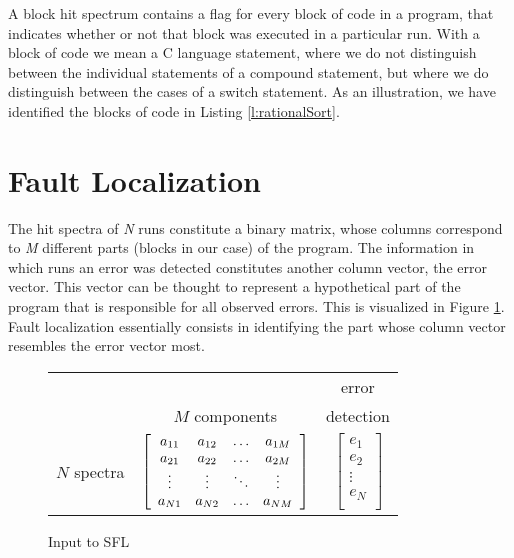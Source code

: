 A block hit spectrum contains a 
flag for every block
of code in a program, that indicates whether or not that
block was executed in a particular run. With a block of
code we mean a C language statement, where we do not
distinguish between the individual statements of a 
compound statement, but where we do distinguish between
the cases of a switch statement. As an illustration, we
have identified the blocks of code in Listing \ref{l:rationalSort}.


\section{Fault Localization}
The hit spectra of \emph{N} runs constitute a binary matrix,
whose columns correspond to \emph{M} different parts (blocks
in our case) of the program. The 
information in which runs an error was detected 
constitutes another column vector, the error vector. This
vector can be thought to represent a hypothetical part
of the program that is responsible for all observed 
errors. 
This is visualized in Figure \ref{fig:Ae}.
Fault localization essentially consists in 
identifying the part whose column vector resembles the error
vector most.

\begin{figure}[h!]
	\begin{center}
	\begin{tabular}{c c c}
							&					& error \\
							& $M$ components	& detection \\
			$N$ spectra 	& 
		$ \left[
		\begin{array}{c c c c}
			a_{11} & a_{12} & \ldots & a_{1M} \\
			a_{21} & a_{22} & \ldots & a_{2M} \\
			\vdots & \vdots & \ddots & \vdots \\
			a_{N1} & a_{N2} & \ldots & a_{NM} \\
		\end{array}
		\right] $
		&
		$ \left[
		\begin{array}{c}
			e_1 \\
			e_2 \\
			\vdots \\
			e_N \\
		\end{array}
		\right] $
		\\
	\end{tabular}
	\caption{Input to SFL}
	\label{fig:Ae}
	\end{center}
\end{figure}

